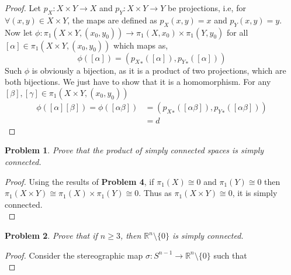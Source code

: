 \documentclass[paper=a4, fontsize=11pt]{scrartcl}
\newtheorem{problem}{Problem}
\begin{document}
\begin{proof}
	Let $p_X:X\times Y \to X$ and $p_Y:X \times Y \to Y$ be projections, i.e, for $\forall (x,y) \in X\times Y$, the maps are defined as $p_X(x,y)=x$ and $p_Y(x,y)=y$. Now let $\phi : \pi_1(X\times Y,(x_0,y_0)) \to \pi_1(X,x_0)\times\pi_1(Y,y_0)$ for all $[\alpha] \in \pi_1(X\times Y,(x_0,y_0))$ which maps as,
	\begin{equation}\nonumber
		\phi([\alpha]) = ({p_X}_*([\alpha]),{p_Y}_*([\alpha]))
	\end{equation}
	Such $\phi$ is obviously a bijection, as it is a product of two projections, which are both bijections. We just have to show that it is a homomorphism. For any $[\beta],[\gamma]\in\pi_1(X\times Y,(x_0,y_0))$  \\
	\begin{equation}\nonumber
		\begin{split}
			\phi([\alpha][\beta]) = \phi([\alpha\beta]) &=({p_X}_*([\alpha\beta]),{p_Y}_*([\alpha\beta])) \\
			&= d
		\end{split}
	\end{equation}
\end{proof}

\begin{problem}
	Prove that the product of simply connected spaces is simply connected.\\
\end{problem}

\begin{proof}
	Using the results of \textbf{Problem 4}, if $\pi_1(X) \cong 0$ and $\pi_1(Y) \cong 0$ then $\pi_1(X \times Y) \cong \pi_1(X) \times \pi_1(Y) \cong 0$. Thus as $\pi_1(X\times Y)\cong 0$, it is simply connected.\\
\end{proof}

\begin{problem}
	Prove that if $n \geq 3$, then $\mathbb{R}^n \setminus \{0\}$ is simply connected.\\
\end{problem}

\begin{proof}
	Consider the stereographic map $\sigma : S^{n-1} \to \mathbb{R}^n \setminus \{0\}$ such that \\
\end{proof}
\end{document}
